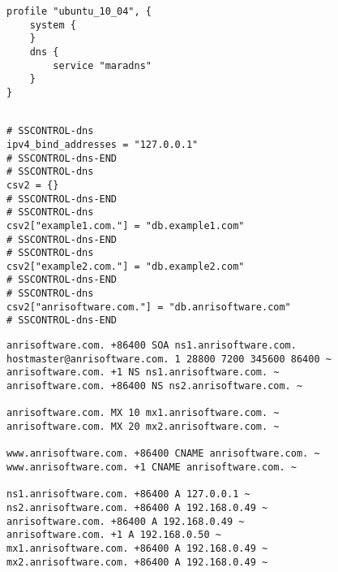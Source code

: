 \begin{lstlisting}[style=Java,label=lst:dns_ubuntu_profile_min,
title={Minimal Ubuntu MaraDNS profile, only the DNS service type is needed. The other profile properties are set to default values.}]
profile "ubuntu_10_04", {
    system {
    }
    dns {
        service "maradns"
    }
}
\end{lstlisting}

\begin{lstlisting}[style=rcfile_nonumbers,
label=lst:dns_mararc_example,
title={Example MaraDNS configuration file that is created from the DNS profile 
and script. The file is saved as /etc/maradns/mararc}]

# SSCONTROL-dns
ipv4_bind_addresses = "127.0.0.1"
# SSCONTROL-dns-END
# SSCONTROL-dns
csv2 = {}
# SSCONTROL-dns-END
# SSCONTROL-dns
csv2["example1.com."] = "db.example1.com"
# SSCONTROL-dns-END
# SSCONTROL-dns
csv2["example2.com."] = "db.example2.com"
# SSCONTROL-dns-END
# SSCONTROL-dns
csv2["anrisoftware.com."] = "db.anrisoftware.com"
# SSCONTROL-dns-END
\end{lstlisting}

\begin{lstlisting}[style=rcfile_nonumbers,
label=lst:dns_zone1_example,
title={Example MaraDNS zone configuration file that is created from the 
DNS script. The file is saved as /etc/maradns/db.anrisoftware.com}]
anrisoftware.com. +86400 SOA ns1.anrisoftware.com. hostmaster@anrisoftware.com. 1 28800 7200 345600 86400 ~
anrisoftware.com. +1 NS ns1.anrisoftware.com. ~
anrisoftware.com. +86400 NS ns2.anrisoftware.com. ~

anrisoftware.com. MX 10 mx1.anrisoftware.com. ~
anrisoftware.com. MX 20 mx2.anrisoftware.com. ~

www.anrisoftware.com. +86400 CNAME anrisoftware.com. ~
www.anrisoftware.com. +1 CNAME anrisoftware.com. ~

ns1.anrisoftware.com. +86400 A 127.0.0.1 ~
ns2.anrisoftware.com. +86400 A 192.168.0.49 ~
anrisoftware.com. +86400 A 192.168.0.49 ~
anrisoftware.com. +1 A 192.168.0.50 ~
mx1.anrisoftware.com. +86400 A 192.168.0.49 ~
mx2.anrisoftware.com. +86400 A 192.168.0.49 ~

\end{lstlisting}

